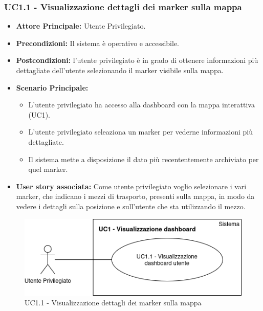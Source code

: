 \documentclass[11pt]{article}
\begin{document}
\begin{justify}
\subsubsection{\textbf{UC1.1 - Visualizzazione dettagli dei marker sulla mappa}}
\begin{itemize}
     \item \textbf{Attore Principale:} Utente Privilegiato.
     \item \textbf{Precondizioni:} Il sistema è operativo e accessibile.
     \item \textbf{Postcondizioni:} l'utente privilegiato è in grado di ottenere informazioni più dettagliate 
     dell'utente selezionando il marker visibile sulla mappa.
     \item \textbf{Scenario Principale:}
     \begin{itemize}
         \item L'utente privilegiato ha accesso alla dashboard con la mappa interattiva (UC1).
         \item L'utente privilegiato seleaziona un marker per vederne informazioni più dettagliate.
         \item Il sistema mette a disposizione il dato più recententemente archiviato per quel marker.
     \end{itemize}
     \item \textbf{User story associata:}
     Come utente privilegiato voglio selezionare i vari marker, che indicano i mezzi di trasporto, presenti sulla 
     mappa, in modo da vedere i dettagli sulla posizione e sull'utente che sta utilizzando il mezzo.
\end{itemize}
\begin{figure}[ht]
    \centering
    \includegraphics[width=0.5\linewidth]{UC1.1image.png}
    \caption{UC1.1 - Visualizzazione dettagli dei marker sulla mappa}
    \label{fig:UC1.1}
\end{figure}


\end{justify}
\end{document}
